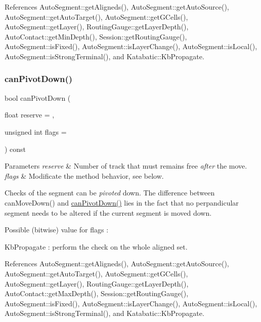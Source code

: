 References Auto\+Segment\+::get\+Aligneds(), Auto\+Segment\+::get\+Auto\+Source(), Auto\+Segment\+::get\+Auto\+Target(), Auto\+Segment\+::get\+G\+Cells(), Auto\+Segment\+::get\+Layer(), Routing\+Gauge\+::get\+Layer\+Depth(), Auto\+Contact\+::get\+Min\+Depth(), Session\+::get\+Routing\+Gauge(), Auto\+Segment\+::is\+Fixed(), Auto\+Segment\+::is\+Layer\+Change(), Auto\+Segment\+::is\+Local(), Auto\+Segment\+::is\+Strong\+Terminal(), and Katabatic\+::\+Kb\+Propagate.

\mbox{\label{classKatabatic_1_1AutoSegment_a24de580d1a371b8d27640cbc3431990b}} 
\subsubsection{\texorpdfstring{can\+Pivot\+Down()}{canPivotDown()}}
{\footnotesize\ttfamily bool can\+Pivot\+Down (\begin{DoxyParamCaption}\item[{float}]{reserve = {},  }\item[{unsigned int}]{flags = {} }\end{DoxyParamCaption}) const}


\begin{DoxyParams}{Parameters}
{\em reserve} & Number of track that must remains free {\itshape after} the move. \\
\hline
{\em flags} & Modificate the method behavior, see below.\\
\hline
\end{DoxyParams}
Checks of the segment can be {\itshape pivoted} down. The difference between {\ttfamily can\+Move\+Down()} and {\ttfamily \hyperlink{classKatabatic_1_1AutoSegment_a24de580d1a371b8d27640cbc3431990b}{can\+Pivot\+Down()}} lies in the fact that no perpandicular segment needs to be altered if the current segment is moved down.

Possible (bitwise) value for {\ttfamily flags} \+:
\begin{DoxyItemize}
\item {\ttfamily Kb\+Propagate} \+: perform the check on the whole aligned set. 
\end{DoxyItemize}

References Auto\+Segment\+::get\+Aligneds(), Auto\+Segment\+::get\+Auto\+Source(), Auto\+Segment\+::get\+Auto\+Target(), Auto\+Segment\+::get\+G\+Cells(), Auto\+Segment\+::get\+Layer(), Routing\+Gauge\+::get\+Layer\+Depth(), Auto\+Contact\+::get\+Max\+Depth(), Session\+::get\+Routing\+Gauge(), Auto\+Segment\+::is\+Fixed(), Auto\+Segment\+::is\+Layer\+Change(), Auto\+Segment\+::is\+Local(), Auto\+Segment\+::is\+Strong\+Terminal(), and Katabatic\+::\+Kb\+Propagate.

